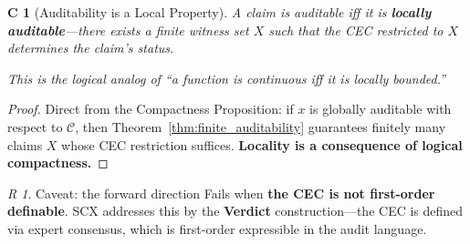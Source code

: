 \documentclass[12pt,a4paper]{article}
\newtheorem{corollary}[theorem]Corollary
\theoremstyle{remark}
\newtheorem{remark}[theorem]Remark
\newcommand{\CEC}{\mathcal{C}}
\begin{document}
\begin{corollary}[Auditability is a Local Property]
A claim is auditable iff it is \textbf{locally auditable}---there exists a finite witness set \(X\) such that the CEC restricted to \(X\) determines the claim's status.

This is the logical analog of ``a function is continuous iff it is locally bounded.''
\end{corollary}
\begin{proof}
Direct from the Compactness Proposition: if \(x\) is globally auditable with respect to \(\CEC\), then Theorem~\ref{thm:finite_auditability} guarantees finitely many claims \(X\) whose CEC restriction suffices. \textbf{Locality is a consequence of logical compactness.}
\end{proof}

\begin{remark}
Caveat: the forward direction Fails when \textbf{the CEC is not first-order definable}. SCX addresses this by the \textbf{Verdict} construction---the CEC is defined via expert consensus, which is first-order expressible in the audit language.
\end{remark}
\end{document}
